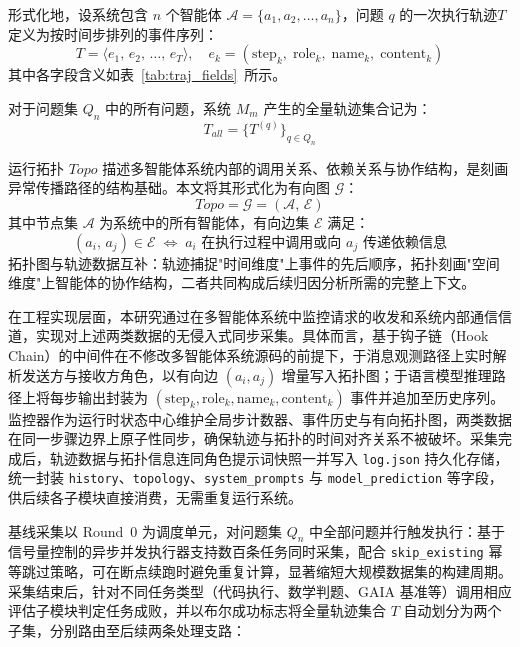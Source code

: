形式化地，设系统包含 $n$ 个智能体 $\mathcal{A} = \{a_1, a_2, \ldots, a_n\}$，问题 $q$ 的一次执行轨迹$ T $定义为按时间步排列的事件序列：
\begin{equation}
  T = \bigl\langle e_1,\, e_2,\, \ldots,\, e_T \bigr\rangle, \quad
  e_k = (\mathrm{step}_k,\; \mathrm{role}_k,\; \mathrm{name}_k,\; \mathrm{content}_k)
  \label{eq:traj}
\end{equation}
其中各字段含义如表~\ref{tab:traj_fields}~所示。

 
对于问题集 $Q_n$ 中的所有问题，系统 $M_m$ 产生的全量轨迹集合记为：
\begin{equation}
  T_{all} = \{T^{(q)}\}_{q \in Q_n}
\end{equation}

运行拓扑 $\mathit{Topo}$ 描述多智能体系统内部的调用关系、依赖关系与协作结构，是刻画异常传播路径的结构基础。本文将其形式化为有向图 $\mathcal{G}$：
\begin{equation}
  \mathit{Topo} = \mathcal{G} = (\mathcal{A},\, \mathcal{E})
\end{equation}
其中节点集 $\mathcal{A}$ 为系统中的所有智能体，有向边集 $\mathcal{E}$ 满足：
\begin{equation}
  (a_i,\, a_j) \in \mathcal{E} \;\Longleftrightarrow\; a_i \text{ 在执行过程中调用或向 } a_j \text{ 传递依赖信息}
\end{equation}
拓扑图与轨迹数据互补：轨迹捕捉"时间维度"上事件的先后顺序，拓扑刻画"空间维度"上智能体的协作结构，二者共同构成后续归因分析所需的完整上下文。

在工程实现层面，本研究通过在多智能体系统中监控请求的收发和系统内部通信信道，实现对上述两类数据的无侵入式同步采集。具体而言，基于钩子链（Hook Chain）的中间件在不修改多智能体系统源码的前提下，于消息观测路径上实时解析发送方与接收方角色，以有向边 $(a_i, a_j)$ 增量写入拓扑图；于语言模型推理路径上将每步输出封装为 $(\mathrm{step}_k, \mathrm{role}_k, \mathrm{name}_k, \mathrm{content}_k)$ 事件并追加至历史序列。监控器作为运行时状态中心维护全局步计数器、事件历史与有向拓扑图，两类数据在同一步骤边界上原子性同步，确保轨迹与拓扑的时间对齐关系不被破坏。采集完成后，轨迹数据与拓扑信息连同角色提示词快照一并写入 \texttt{log.json} 持久化存储，统一封装 \texttt{history}、\texttt{topology}、\texttt{system\_prompts} 与 \texttt{model\_prediction} 等字段，供后续各子模块直接消费，无需重复运行系统。

基线采集以 Round~0 为调度单元，对问题集 $Q_n$ 中全部问题并行触发执行：基于信号量控制的异步并发执行器支持数百条任务同时采集，配合 \texttt{skip\_existing} 幂等跳过策略，可在断点续跑时避免重复计算，显著缩短大规模数据集的构建周期。采集结束后，针对不同任务类型（代码执行、数学判题、GAIA 基准等）调用相应评估子模块判定任务成败，并以布尔成功标志将全量轨迹集合 $T$ 自动划分为两个子集，分别路由至后续两条处理支路：
 
